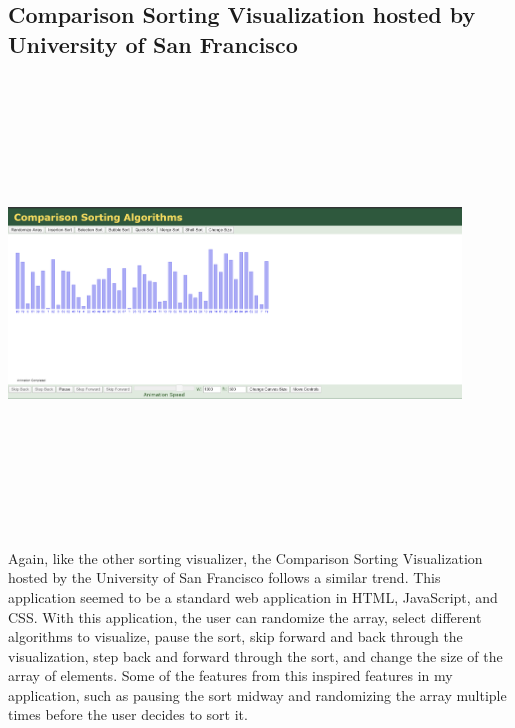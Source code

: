 \subsection{Comparison Sorting Visualization hosted by University of San Francisco}
\begin{center}
    \includegraphics[width=12cm,height=12cm,keepaspectratio]{images/compsort}
\end{center}
Again, like the other sorting visualizer, the Comparison Sorting Visualization hosted by the University of San Francisco \cite{sorting_3} follows a similar trend. This application seemed to be a standard web application in HTML, JavaScript, and CSS. With this application, the user can randomize the array, select different algorithms to visualize, pause the sort, skip forward and back through the visualization, step back and forward through the sort, and change the size of the array of elements. Some of the features from this inspired features in my application, such as pausing the sort midway and randomizing the array multiple times before the user decides to sort it.

\newpage
